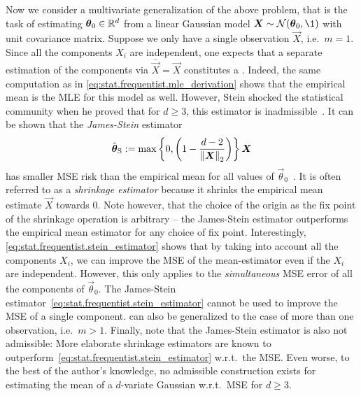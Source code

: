 Now we consider a multivariate generalization of the above problem, that is the task of estimating ${\boldsymbol{\theta}}_0 \in {\mathbb{R}}^d$ from a linear Gaussian model $\vec X \sim \Normal(\vec\theta_0, \1)$ with unit covariance matrix.
Suppose we only have a single observation $\vec X$, i.e.\ $m=1$.
Since all the components $X_i$ are independent, one expects that a separate estimation of the components via $\bar{\vec X} = \vec X$ constitutes a .
Indeed, the same computation as in \cref{eq:stat.frequentist.mle_derivation} shows that the empirical mean is the MLE for this model as well.
However, Stein shocked the statistical community when he proved that for $d \ge 3$, this estimator is inadmissible~\cite{Stein_1956_Inadmissibility}.
It can be shown that the \emph{James-Stein} estimator
\[
  \hat{{\boldsymbol{\theta}}}_{\mathrm{S}} := \max\left\{0, \left( 1 - \frac{d - 2}{{\Vert{\boldsymbol{X}}\Vert}_2} \right) \right\} {\boldsymbol{X}}
  \label{eq:stat.frequentist.stein_estimator}
\]
has smaller MSE risk than the empirical mean for all values of $\vec \theta_0$~\cite{Stein_1956_Inadmissibility,Lehmann_1998_Theory}.
It is often referred to as a \emph{shrinkage estimator} because it shrinks the empirical mean estimate $\vec X$ towards 0.
Note however, that the choice of the origin as the fix point of the shrinkage operation is arbitrary -- the James-Stein estimator outperforms the empirical mean estimator for any choice of fix point.
Interestingly, \cref{eq:stat.frequentist.stein_estimator} shows that by taking into account all the components $X_i$, we can improve the MSE of the mean-estimator even if the $X_i$ are independent.
However, this only applies to the \emph{simultaneous} MSE error of all the components of $\vec \theta_0$.
The James-Stein estimator~\eqref{eq:stat.frequentist.stein_estimator} cannot be used to improve the MSE of a single component.
 can also be generalized to the case of more than one observation, i.e.\ $m > 1$.
Finally, note that the James-Stein estimator is also not admissible:
More elaborate shrinkage estimators are known to outperform~\eqref{eq:stat.frequentist.stein_estimator} w.r.t.\ the MSE.
Even worse, to the best of the author's knowledge, no admissible construction exists for estimating the mean of a $d$-variate Gaussian w.r.t.\ MSE for $d \ge 3$.\\


